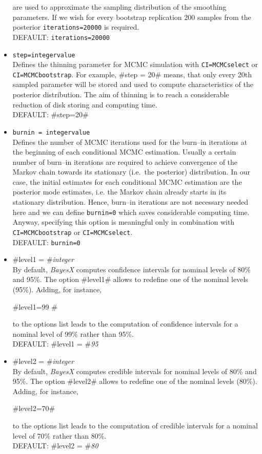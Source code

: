 \begin{itemize}
are used  to approximate the sampling
distribution of the smoothing parameters. If we wish for every bootstrap replication 200 samples from the posterior
{\tt iterations=20000} is required.     \\
DEFAULT: {\tt iterations=20000}
\item {\tt step=integervalue} \\
Defines the thinning parameter for MCMC simulation with {\tt CI=MCMCselect} or {\tt CI=MCMCbootstrap}. For example,
#step = 20# means, that only every 20th sampled parameter will be
stored and used to compute characteristics of the posterior
distribution. The aim of thinning is to reach a considerable reduction of disk storing and computing time.\\
DEFAULT: #step=20#
\item {\tt burnin = integervalue} \\
Defines the number of MCMC iterations used for the burn--in iterations
at the beginning of each conditional MCMC estimation.
Usually a certain number of burn--in iterations are required
to achieve convergence of the Markov chain towards its stationary (i.e.~the posterior) distribution.
In our case, the initial estimates for each conditional MCMC estimation are the posterior mode estimates, i.e.
the Markov chain already starts in its stationary distribution.
Hence,  burn--in iterations are not necessary  needed here and we can define {\tt burnin=0} which
saves considerable computing time.
Anyway, specifying this option is meaningful only in combination with {\tt CI=MCMCbootstrap} or {\tt CI=MCMCselect}. \\
DEFAULT: {\tt burnin=0}
\item \label{stepwisereglevel1} #level1 = #{\em integer} \\
By default, {\em BayesX} computes confidence intervals for
nominal levels of 80\% and 95\%. The option #level1# allows to
redefine one of the nominal levels (95\%). Adding, for instance,

#level1=99 #

to the options list leads to the computation of confidence intervals
for a nominal level of 99\% rather than 95\%. \\
DEFAULT: #level1 = #{\em 95}
\item \label{remlreglevel2} #level2 = #{\em integer} \\
By default, {\em BayesX} computes credible intervals for
nominal levels of 80\% and 95\%. The option #level2# allows to
redefine one of the nominal levels (80\%). Adding, for instance,

#level2=70#

to the options list leads to the computation of credible intervals
for a nominal level of 70\% rather than 80\%. \\
DEFAULT: #level2 = #{\em 80}
\end{itemize}


